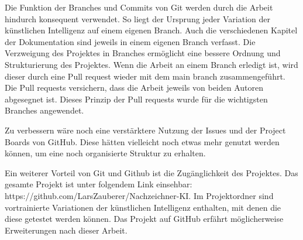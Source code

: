 Die Funktion der Branches und Commits von Git werden durch die Arbeit hindurch
konsequent verwendet. So liegt der Ursprung jeder Variation der künstlichen
Intelligenz auf einem eigenen Branch. Auch die verschiedenen Kapitel der
Dokumentation sind jeweils in einem eigenen Branch verfasst. Die Verzweigung des
Projektes in Branches ermöglicht eine bessere Ordnung und Strukturierung des
Projektes. Wenn die Arbeit an einem Branch erledigt ist, wird dieser durch eine
Pull request wieder mit dem main branch zusammengeführt. Die Pull requests
versichern, dass die Arbeit jeweils von beiden Autoren abgesegnet ist. Dieses
Prinzip der Pull requests wurde für die wichtigsten Branches angewendet.

Zu verbessern wäre noch eine verstärktere Nutzung der Issues und der Project
Boards von GitHub. Diese hätten vielleicht noch etwas mehr genutzt werden
können, um eine noch organisierte Struktur zu erhalten.

Ein weiterer Vorteil von Git und Github ist die Zugänglichkeit des Projektes.
Das gesamte Projekt ist unter folgendem Link einsehbar:
https://github.com/LarsZauberer/Nachzeichner-KI. Im Projektordner sind
vortrainierte Variationen der künstlichen Intelligenz enthalten, mit denen die
diese getestet werden können. Das Projekt auf GitHub erfährt möglicherweise
Erweiterungen nach dieser Arbeit.






